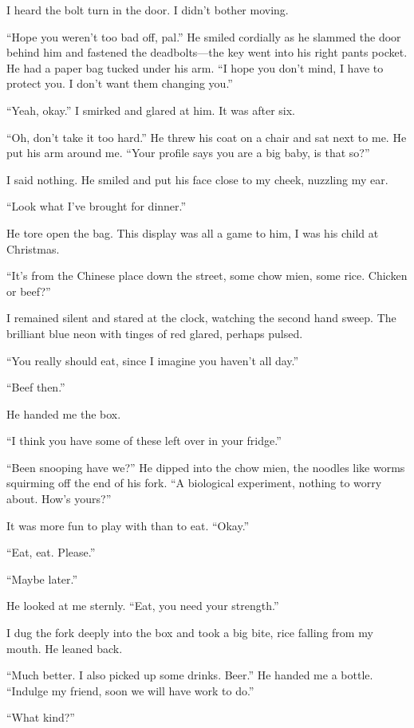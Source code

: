\documentclass[
]{article}
\begin{document}
I heard the bolt turn in the door. I didn't bother moving.

``Hope you weren't too bad off, pal.'' He smiled cordially as he slammed
the door behind him and fastened the deadbolts---the key went into his
right pants pocket. He had a paper bag tucked under his arm. ``I hope
you don't mind, I have to protect you. I don't want them changing you.''

``Yeah, okay.'' I smirked and glared at him. It was after six.

``Oh, don't take it too hard.'' He threw his coat on a chair and sat
next to me. He put his arm around me. ``Your profile says you are a big
baby, is that so?''

I said nothing. He smiled and put his face close to my cheek, nuzzling
my ear.

``Look what I've brought for dinner.''

He tore open the bag. This display was all a game to him, I was his
child at Christmas.

``It's from the Chinese place down the street, some chow mien, some
rice. Chicken or beef?''

I remained silent and stared at the clock, watching the second hand
sweep. The brilliant blue neon with tinges of red glared, perhaps
pulsed.

``You really should eat, since I imagine you haven't all day.''

``Beef then.''

He handed me the box.

``I think you have some of these left over in your fridge.''

``Been snooping have we?'' He dipped into the chow mien, the noodles
like worms squirming off the end of his fork. ``A biological experiment,
nothing to worry about. How's yours?''

It was more fun to play with than to eat. ``Okay.''

``Eat, eat. Please.''

``Maybe later.''

He looked at me sternly. ``Eat, you need your strength.''

I dug the fork deeply into the box and took a big bite, rice falling
from my mouth. He leaned back.

``Much better. I also picked up some drinks. Beer.'' He handed me a
bottle. ``Indulge my friend, soon we will have work to do.''

``What kind?''
\end{document}
